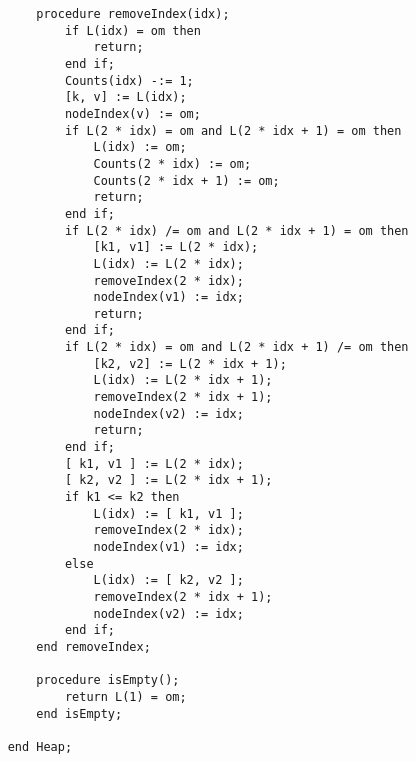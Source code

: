 \begin{Verbatim}
        procedure removeIndex(idx);
            if L(idx) = om then
                return;
            end if;
            Counts(idx) -:= 1;
            [k, v] := L(idx);
            nodeIndex(v) := om;
            if L(2 * idx) = om and L(2 * idx + 1) = om then
                L(idx) := om;
                Counts(2 * idx) := om;
                Counts(2 * idx + 1) := om;
                return;
            end if;
            if L(2 * idx) /= om and L(2 * idx + 1) = om then
                [k1, v1] := L(2 * idx);
                L(idx) := L(2 * idx);
                removeIndex(2 * idx);
                nodeIndex(v1) := idx;
                return;
            end if;
            if L(2 * idx) = om and L(2 * idx + 1) /= om then
                [k2, v2] := L(2 * idx + 1);
                L(idx) := L(2 * idx + 1);
                removeIndex(2 * idx + 1);
                nodeIndex(v2) := idx;
                return;
            end if;
            [ k1, v1 ] := L(2 * idx);
            [ k2, v2 ] := L(2 * idx + 1);
            if k1 <= k2 then
                L(idx) := [ k1, v1 ];
                removeIndex(2 * idx);
                nodeIndex(v1) := idx;
            else
                L(idx) := [ k2, v2 ];
                removeIndex(2 * idx + 1);
                nodeIndex(v2) := idx;
            end if;
        end removeIndex;
   
        procedure isEmpty();
            return L(1) = om;
        end isEmpty;
   
    end Heap;
\end{Verbatim}

